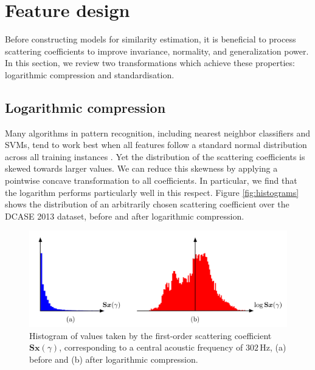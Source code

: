 \documentclass[smallextended]{svjour3}
\begin{document}
\section{Feature design}
\label{sec:design}

Before constructing models for similarity estimation, it is beneficial to process scattering coefficients to improve invariance, normality, and generalization power.
In this section, we review two transformations which achieve these properties: logarithmic compression and standardisation.

\subsection{Logarithmic compression}
\label{sec:logcomp}

Many algorithms in pattern recognition, including nearest neighbor classifiers and SVMs, tend to work best when all features follow a standard normal distribution across all training instances \cite{Hsu2003}.
Yet the distribution of the scattering coefficients is skewed towards larger values. We can reduce this skewness by applying a pointwise concave transformation to all coefficients. In particular, we find that the logarithm performs particularly well in this respect.
Figure \ref{fig:histograms} shows the distribution of an arbitrarily chosen scattering coefficient over the DCASE 2013 dataset, before and after logarithmic compression.

\begin{figure}
\begin{center}
\includegraphics[width=\columnwidth]{figures/compression}
\caption{
\label{fig:histograms}
Histogram of values taken by the first-order scattering coefficient $\mathbf{S}\boldsymbol{x}(\gamma)$, corresponding to a central acoustic frequency of $302\,\mathrm{Hz}$,
(a) before and (b) after logarithmic compression.}
\label{fig:compression}
\end{center}
\end{figure}
\end{document}
